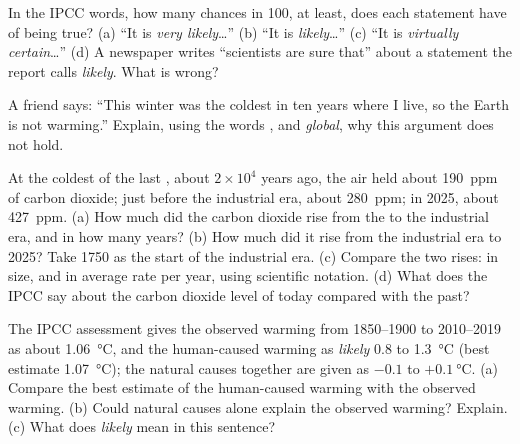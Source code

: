 \begin{exercise}[$\star\star$]\label{exo:g9:climate-past-and-present:9}
In the IPCC words, how many chances in 100, at least, does each statement
have of being true? (a) ``It is \emph{very likely}\ldots'' (b) ``It is
\emph{likely}\ldots'' (c) ``It is \emph{virtually certain}\ldots'' (d) A
newspaper writes ``scientists are sure that'' about a statement the report
calls \emph{likely}. What is wrong?
\end{exercise}

\begin{exercise}[$\star\star$]\label{exo:g9:climate-past-and-present:10}
A friend says: ``This winter was the coldest in ten years where I live,
so the Earth is not warming.'' Explain, using the words \emph{},
\emph{} and \emph{global}, why this argument does not hold.
\end{exercise}

\begin{exercise}[$\star\star\star$]\label{exo:g9:climate-past-and-present:11}
At the coldest of the last , about $2 \times 10^4$ years ago, the
air held about \qty{190}{ppm} of carbon dioxide; just before the
industrial era, about \qty{280}{ppm}; in 2025, about \qty{427}{ppm}.
(a) How much did the carbon dioxide rise from the  to the
industrial era, and in how many years? (b) How much did it rise from
the industrial era to 2025? Take 1750 as the start of the industrial era.
(c) Compare the two rises: in size, and in average rate per year, using
scientific notation. (d) What does the IPCC say about the carbon dioxide
level of today compared with the past?
\end{exercise}

\begin{exercise}[$\star\star\star$]\label{exo:g9:climate-past-and-present:12}
The IPCC assessment gives the observed warming from 1850--1900 to
2010--2019 as about \qty{1.06}{\degreeCelsius}, and the human-caused
warming as \emph{likely} 0.8 to \qty{1.3}{\degreeCelsius} (best estimate
\qty{1.07}{\degreeCelsius}); the natural causes together are given as
$-0.1$ to $+\qty{0.1}{\degreeCelsius}$. (a) Compare the best estimate of
the human-caused warming with the observed warming. (b) Could natural causes
alone explain the observed warming? Explain. (c) What does
\emph{likely} mean in this sentence?
\end{exercise}

